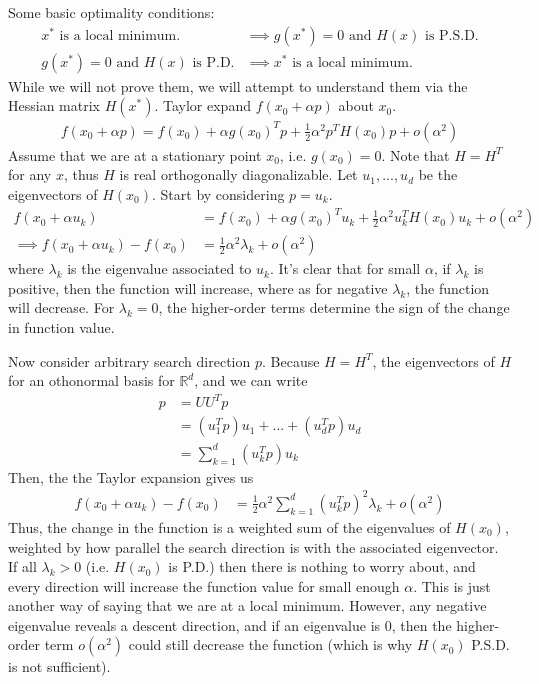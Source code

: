 \documentclass[11pt]{article}
\newcommand{\R}{\ensuremath{\mathbb R}}
\theoremstyle{plain}
\theoremstyle{definition}
\theoremstyle{remark}
\begin{document}
Some basic optimality conditions:
\begin{align*}
    \text{$x^*$ is a local minimum.} &\implies g(x^*) = 0 \text{ and  $H(x)$ is P.S.D.}\\
    g(x^*) = 0\text{ and  $H(x)$ is P.D.} &\implies \text{$x^*$ is a local minimum.}
\end{align*}
While we will not prove them, we will attempt to understand them via the Hessian matrix $H(x^*)$. Taylor expand $f(x_0 + \alpha p)$ about $x_0$.
\begin{align*}
    f(x_0 + \alpha p) = f(x_0) + \alpha g(x_0)^T p + \frac{1}{2} \alpha^2 p^T H(x_0) p + o(\alpha^2)
\end{align*}
Assume that we are at a stationary point $x_0$, i.e. $g(x_0) = 0$. Note that $H = H^T$ for any $x$, thus $H$ is real orthogonally diagonalizable. Let $u_1, ..., u_d$ be the eigenvectors of $H(x_0)$. Start by considering $p = u_k$.
\begin{align*}
    f(x_0 + \alpha u_k) &= f(x_0) + \alpha g(x_0)^T u_k + \frac{1}{2} \alpha^2 u_k^T H(x_0) u_k + o(\alpha^2)\\
    \implies f(x_0 + \alpha u_k) - f(x_0) &= \frac{1}{2} \alpha^2 \lambda_k + o(\alpha^2)
\end{align*}
where $\lambda_k$ is the eigenvalue associated to $u_k$. It's clear that for small $\alpha$, if $\lambda_k$ is positive, then the function will increase, where as for negative $\lambda_k$, the function will decrease. For $\lambda_k = 0$, the higher-order terms determine the sign of the change in function value.

Now consider arbitrary search direction $p$. Because $H = H^T$, the eigenvectors of $H$ for an othonormal basis for $\R^d$, and we can write
\begin{align*}
    p &= UU^Tp\\
    &= (u_1^T p) u_1 + ... + (u_d^T p) u_d\\
    &= \sum_{k=1}^d (u_k^T p) u_k
\end{align*}
Then, the the Taylor expansion gives us
\begin{align*}
    f(x_0 + \alpha u_k) - f(x_0) &= \frac{1}{2} \alpha^2 \sum_{k=1}^d (u_k^T p)^2 \lambda_k + o(\alpha^2)
\end{align*}
Thus, the change in the function is a weighted sum of the eigenvalues of $H(x_0)$, weighted by how parallel the search direction is with the associated eigenvector. If all $\lambda_k > 0$ (i.e. $H(x_0)$ is P.D.) then there is nothing to worry about, and every direction will increase the function value for small enough $\alpha$. This is just another way of saying that we are at a local minimum. However, any negative eigenvalue reveals a descent direction, and if an eigenvalue is 0, then the higher-order term $o(\alpha^2)$ could still decrease the function (which is why $H(x_0)$ P.S.D. is not sufficient). 
\end{document}
